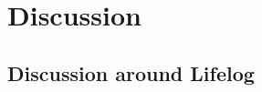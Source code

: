 \documentclass{cslthse-msc}
\begin{document}
\chapter{Discussion}

\section{Discussion around Lifelog}





\end{document}
